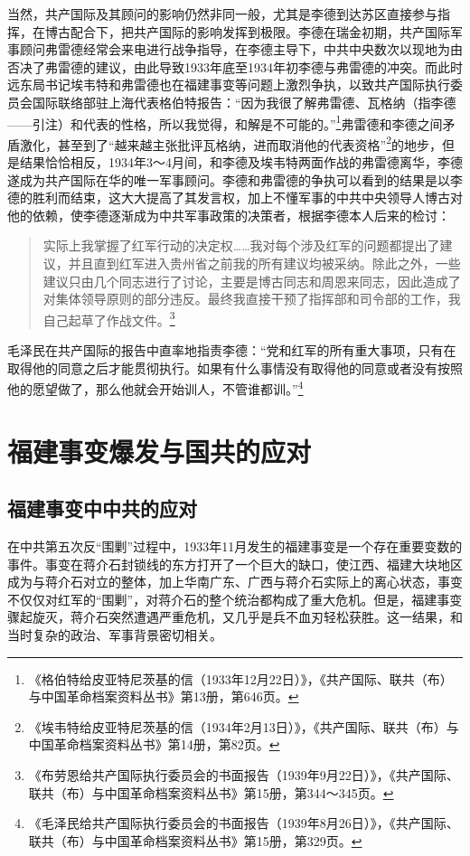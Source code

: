 当然，共产国际及其顾问的影响仍然非同一般，尤其是李德到达苏区直接参与指挥，在博古配合下，把共产国际的影响发挥到极限。李德在瑞金初期，共产国际军事顾问弗雷德经常会来电进行战争指导，在李德主导下，中共中央数次以现地为由否决了弗雷德的建议，由此导致1933年底至1934年初李德与弗雷德的冲突。而此时远东局书记埃韦特和弗雷德也在福建事变等问题上激烈争执，以致共产国际执行委员会国际联络部驻上海代表格伯特报告：“因为我很了解弗雷德、瓦格纳（指李德——引注）和代表的性格，所以我觉得，和解是不可能的。”\footnote{《格伯特给皮亚特尼茨基的信（1933年12月22日）》，《共产国际、联共（布）与中国革命档案资料丛书》第13册，第646页。}弗雷德和李德之间矛盾激化，甚至到了“越来越主张批评瓦格纳，进而取消他的代表资格”\footnote{《埃韦特给皮亚特尼茨基的信（1934年2月13日）》，《共产国际、联共（布）与中国革命档案资料丛书》第14册，第82页。}的地步，但是结果恰恰相反，1934年3～4月间，和李德及埃韦特两面作战的弗雷德离华，李德遂成为共产国际在华的唯一军事顾问。李德和弗雷德的争执可以看到的结果是以李德的胜利而结束，这大大提高了其发言权，加上不懂军事的中共中央领导人博古对他的依赖，使李德逐渐成为中共军事政策的决策者，根据李德本人后来的检讨：

\begin{quote}

实际上我掌握了红军行动的决定权……我对每个涉及红军的问题都提出了建议，并且直到红军进入贵州省之前我的所有建议均被采纳。除此之外，一些建议只由几个同志进行了讨论，主要是博古同志和周恩来同志，因此造成了对集体领导原则的部分违反。最终我直接干预了指挥部和司令部的工作，我自己起草了作战文件。\footnote{《布劳恩给共产国际执行委员会的书面报告（1939年9月22日）》，《共产国际、联共（布）与中国革命档案资料丛书》第15册，第344～345页。}
\end{quote}


毛泽民在共产国际的报告中直率地指责李德：“党和红军的所有重大事项，只有在取得他的同意之后才能贯彻执行。如果有什么事情没有取得他的同意或者没有按照他的愿望做了，那么他就会开始训人，不管谁都训。”\footnote{《毛泽民给共产国际执行委员会的书面报告（1939年8月26日）》，《共产国际、联共（布）与中国革命档案资料丛书》第15册，第329页。}

\section{福建事变爆发与国共的应对}

\subsection{福建事变中中共的应对}


在中共第五次反“围剿”过程中，1933年11月发生的福建事变是一个存在重要变数的事件。事变在蒋介石封锁线的东方打开了一个巨大的缺口，使江西、福建大块地区成为与蒋介石对立的整体，加上华南广东、广西与蒋介石实际上的离心状态，事变不仅仅对红军的“围剿”，对蒋介石的整个统治都构成了重大危机。但是，福建事变骤起旋灭，蒋介石突然遭遇严重危机，又几乎是兵不血刃轻松获胜。这一结果，和当时复杂的政治、军事背景密切相关。


